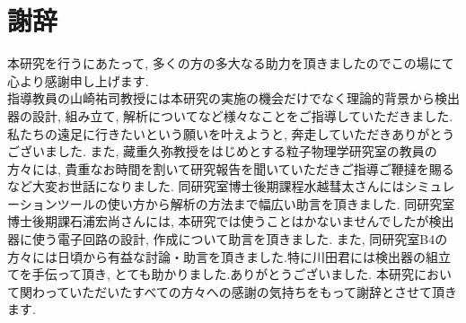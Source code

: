 \chapter{謝辞}\label{acknowledgements}
本研究を行うにあたって, 多くの方の多大なる助力を頂きましたのでこの場にて心より感謝申し上げます.
\\
指導教員の山崎祐司教授には本研究の実施の機会だけでなく理論的背景から検出器の設計, 組み立て, 解析についてなど様々なことをご指導していただきました.
私たちの遠足に行きたいという願いを叶えようと, 奔走していただきありがとうございました.
また, 藏重久弥教授をはじめとする粒子物理学研究室の教員の方々には, 貴重なお時間を割いて研究報告を聞いていただきご指導ご鞭撻を賜るなど大変お世話になりました.
同研究室博士後期課程水越彗太さんにはシミュレーションツールの使い方から解析の方法まで幅広い助言を頂きました.
同研究室博士後期課石浦宏尚さんには, 本研究では使うことはかないませんでしたが検出器に使う電子回路の設計, 作成について助言を頂きました.
また, 同研究室B4の方々には日頃から有益な討論・助言を頂きました.特に川田君には検出器の組立てを手伝って頂き, とても助かりました.ありがとうございました.
本研究において関わっていただいたすべての方々への感謝の気持ちをもって謝辞とさせて頂きます.